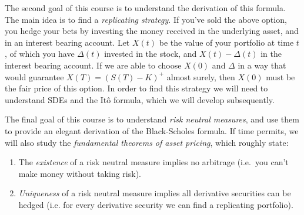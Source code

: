 The second goal of this course is to understand the derivation of this formula.
The main idea is to find a \emph{replicating strategy}.
If you've sold the above option, you hedge your bets by investing the money received in the underlying asset, and in an interest bearing account.
Let $X(t)$ be the value of your portfolio at time $t$, of which you have $\Delta(t)$ invested in the stock, and $X(t) - \Delta(t)$ in the interest bearing account.
If we are able to choose $X(0)$ and $\Delta$ in a way that would guarantee $X(T) = (S(T) - K)^+$ almost surely, then $X(0)$ must be the fair price of this option.
In order to find this strategy we will need to understand SDEs and the It\^o formula, which we will develop subsequently.

The final goal of this course is to understand \emph{risk neutral measures}, and use them to provide an elegant derivation of the Black-Scholes formula.
If time permits, we will also study the \emph{fundamental theorems of asset pricing}, which roughly state:
\begin{enumerate}
  \item
    The \emph{existence} of a risk neutral measure implies no arbitrage (i.e.\ you can't make money without taking risk).
  \item
    \emph{Uniqueness} of a risk neutral measure implies all derivative securities can be hedged (i.e. for every derivative security we can find a replicating portfolio).
\end{enumerate}

